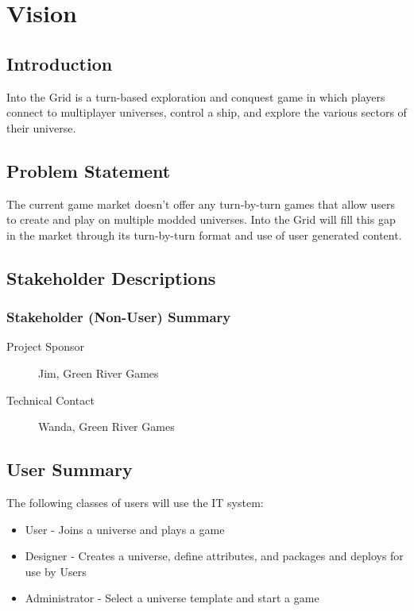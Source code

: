 \chapter{Vision}

\section{Introduction}

Into the Grid is a turn-based exploration and conquest game in which players connect to multiplayer universes, control a ship, and explore the various sectors of their universe.

\section{Problem Statement}
The current game market doesn't offer any turn-by-turn games that allow users to create and play on multiple modded universes.
Into the Grid will fill this gap in the market through its turn-by-turn format and use of user generated content.

\section{Stakeholder Descriptions}

\subsection{Stakeholder (Non-User) Summary}

\begin{description}
	\item[Project Sponsor] Jim, Green River Games
	\item[Technical Contact] Wanda, Green River Games
\end{description}

\section{User Summary}

The following classes of users will use the IT system:

\begin{itemize}
	\item User - Joins a universe and plays a game
	\item Designer - Creates a universe, define attributes, and packages and deploys for use by Users
	\item Administrator - Select a universe template and start a game
\end{itemize}

